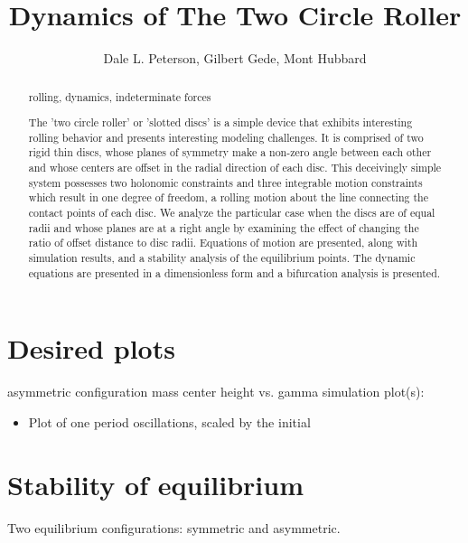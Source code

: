 \documentclass{rspublic}
\begin{document}
\title[Two Circle Roller]{Dynamics of The Two Circle Roller}

\author[D.L. Peterson, G. Gede, M. Hubbard]{Dale L. Peterson, Gilbert Gede,
Mont Hubbard}


\label{firstpage}
\maketitle

\begin{abstract}{rolling, dynamics, indeterminate forces}

The 'two circle roller' or 'slotted discs' is a simple device that exhibits
interesting rolling behavior and presents interesting modeling challenges.  It
is comprised of two rigid thin discs, whose planes of symmetry make a non-zero
angle between each other and whose centers are offset in the radial direction
of each disc.  This deceivingly simple system possesses two holonomic
constraints and three integrable motion constraints which result in one degree
of freedom, a rolling motion about the line connecting the contact points of
each disc.  We analyze the particular case when the discs are of equal radii
and whose planes are at a right angle by examining the effect of changing the
ratio of offset distance to disc radii.  Equations of motion are presented,
along with simulation results, and a stability analysis of the equilibrium
points.  The dynamic equations are presented in a dimensionless form and a
bifurcation analysis is presented.

\end{abstract}

\section{Desired plots}
asymmetric configuration mass center height vs. gamma
simulation plot(s):  
\begin{itemize}
 \item Plot of one period oscillations, scaled by the initial
\end{itemize}


\section{Stability of equilibrium}
Two equilibrium configurations: symmetric and asymmetric. 
\end{document}
